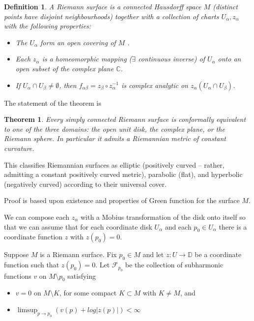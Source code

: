\documentclass[12pt]{article}
\newtheorem{theorem}{Theorem}
\newtheorem{definition}{Definition}
\begin{document}
\begin{definition}
  A Riemann surface is a connected Hausdorff space $M$ (distinct points have disjoint neighbourhoods) together with a collection
  of charts ${U_{\alpha} , z_{\alpha} }$ with the following properties:
  \begin{itemize}
  \item The $U_{\alpha}$ form an open covering of $M$ .
  \item Each $z_{\alpha}$ is a homeomorphic mapping ($\exists$ continuous inverse) of $U_{\alpha}$ onto an open subset of the complex plane $\mathbb{C}$.
  \item If $U_{\alpha}\cap  U_{\beta} \neq \emptyset$, then $f_{\alpha\beta} = z_{\beta}\circ  z_{\alpha}^{-1}$ is complex analytic on $z_{\alpha} (U_{\alpha} \cap U_{\beta} )$.
  \end{itemize}  
\end{definition}

The statement of the theorem is 
\begin{theorem}
  Every simply connected Riemann surface is conformally equivalent to one of the three domains: the
  open unit disk, the complex plane, or the Riemann sphere. In particular it admits a Riemannian
  metric of constant curvature.
\end{theorem} 

This classifies Riemannian surfaces as elliptic (positively curved -- rather, admitting a constant
positively curved metric), parabolic (flat), and hyperbolic (negatively curved) according to their
universal cover.

Proof is based upon existence and properties of Green function for the surface $M$.

 We can
 compose each $z_{\alpha}$ with a Mobius transformation of the disk onto itself so that we can
assume that for each coordinate disk $U_{\alpha}$ and each $p_{0}\in  U_{\alpha}$ there is a coordinate function
$z$ with $z (p_{0} ) = 0$.

     Suppose $M$ is a Riemann surface. Fix $p_{0}\in  M$ and let $z : U\to  \mathbb{D}$ be a coordinate
function such that $z(p_{0} ) = 0$. Let $\mathcal{F}_{p_{0}}$ be the collection of subharmonic
functions $v$ on $M \setminus p_{0}$ satisfying
\begin{itemize}
\item $v = 0$ on $M \setminus K$, for some compact $K\subset M$ with $K \neq M$, and
\item $\limsup_{p\to p_{0}} (v(p) + log |z(p)|) < \infty$
\end{itemize}
\end{document}
